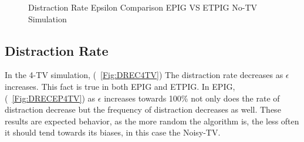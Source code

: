 \documentclass[12pt]{thesis}
\begin{document}
\begin{figure}	
	\begin{center}
		\hfill
		
		\hfill
	\end{center}	
	\caption{Distraction Rate Epsilon Comparison EPIG VS ETPIG No-TV Simulation}
	\label{Fig:DREC0TV}
\end{figure}


\subsection{Distraction Rate}
In the 4-TV simulation, (\figurename~\ref{Fig:DREC4TV}) The distraction rate decreases as $\epsilon$ increases. This fact is true in both EPIG and ETPIG. In EPIG, (\figurename~\ref{Fig:DRECEP4TV}) as $\epsilon$ increases towards 100\% not only does the rate of distraction decrease but the frequency of distraction decreases as well. These results are expected behavior, as the more random the algorithm is, the less often it should tend towards its biases, in this case the Noisy-TV.
\end{document}
